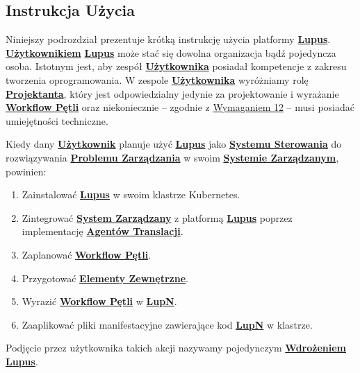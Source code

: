\subsection{Instrukcja Użycia}

Niniejszy podrozdział prezentuje krótką instrukcję użycia platformy \hyperlink{def:lupus}{\textbf{Lupus}}. \hyperlink{def:uzytkownik}{\textbf{Użytkownikiem}} \hyperlink{def:lupus}{\textbf{Lupus}} może stać się dowolna organizacja bądź pojedyncza osoba. Istotnym jest, aby zespół \hyperlink{def:uzytkownik}{\textbf{Użytkownika}} posiadał kompetencje z zakresu tworzenia oprogramowania. W zespole \hyperlink{def:uzytkownik}{\textbf{Użytkownika}} wyróżniamy rolę \hyperlink{def:projektant}{\textbf{Projektanta}}, który jest odpowiedzialny jedynie za projektowanie i wyrażanie \hyperlink{def:workflow-petli}{\textbf{Workflow Pętli}} oraz niekoniecznie – zgodnie z \hyperref[req:12]{Wymaganiem 12} – musi posiadać umiejętności techniczne. 

Kiedy dany \hyperlink{def:uzytkownik}{\textbf{Użytkownik}} planuje użyć \hyperlink{def:lupus}{\textbf{Lupus}} jako \hyperlink{def:system-sterowania}{\textbf{Systemu Sterowania}} do rozwiązywania \hyperlink{def:problem-zarzadzania}{\textbf{Problemu Zarządzania}} w swoim \hyperlink{def:system-zarzadzany}{\textbf{Systemie Zarządzanym}}, powinien:
\begin{enumerate}
    \item Zainstalować \hyperlink{def:lupus}{\textbf{Lupus}} w swoim klastrze Kubernetes.
    \item Zintegrować \hyperlink{def:system-zarzadzany}{\textbf{System Zarządzany}} z platformą \hyperlink{def:lupus}{\textbf{Lupus}} poprzez implementację \hyperlink{def:agent-translacji}{\textbf{Agentów Translacji}}.
    \item Zaplanować \hyperlink{def:workflow-petli}{\textbf{Workflow Pętli}}.
    \item Przygotować \hyperlink{def:element-zewnetrzny}{\textbf{Elementy Zewnętrzne}}.
    \item Wyrazić \hyperlink{def:workflow-petli}{\textbf{Workflow Pętli}} w \hyperlink{def:lupn}{\textbf{LupN}}.
    \item Zaaplikować pliki manifestacyjne zawierające kod \hyperlink{def:lupn}{\textbf{LupN}} w klastrze.
\end{enumerate}

Podjęcie przez użytkownika takich akcji nazywamy pojedynczym \hyperlink{def:wdrozenie-lupus}{\textbf{Wdrożeniem Lupus}}.

